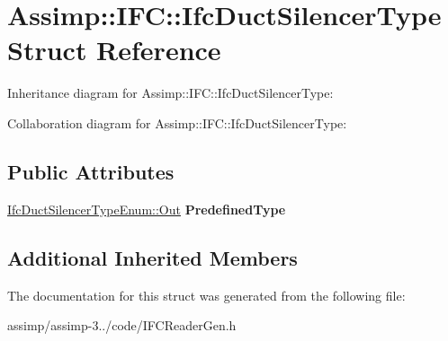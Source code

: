 \hypertarget{struct_assimp_1_1_i_f_c_1_1_ifc_duct_silencer_type}{\section{Assimp\+:\+:I\+F\+C\+:\+:Ifc\+Duct\+Silencer\+Type Struct Reference}
\label{struct_assimp_1_1_i_f_c_1_1_ifc_duct_silencer_type}
}


Inheritance diagram for Assimp\+:\+:I\+F\+C\+:\+:Ifc\+Duct\+Silencer\+Type\+:


Collaboration diagram for Assimp\+:\+:I\+F\+C\+:\+:Ifc\+Duct\+Silencer\+Type\+:
\subsection*{Public Attributes}
\begin{DoxyCompactItemize}
\item 
\hypertarget{struct_assimp_1_1_i_f_c_1_1_ifc_duct_silencer_type_ad0646ce77d6365fe2bc4d144bc29ca80}{\hyperlink{classboost_1_1shared__ptr}{Ifc\+Duct\+Silencer\+Type\+Enum\+::\+Out} {\bfseries Predefined\+Type}}\label{struct_assimp_1_1_i_f_c_1_1_ifc_duct_silencer_type_ad0646ce77d6365fe2bc4d144bc29ca80}

\end{DoxyCompactItemize}
\subsection*{Additional Inherited Members}


The documentation for this struct was generated from the following file\+:\begin{DoxyCompactItemize}
\item 
assimp/assimp-\/3../code/I\+F\+C\+Reader\+Gen.\+h\end{DoxyCompactItemize}
